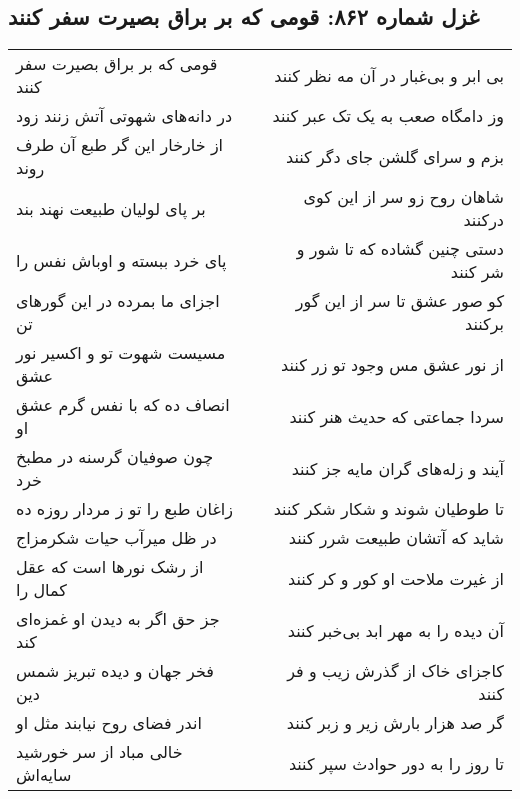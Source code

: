 \begin{center}
\section*{غزل شماره ۸۶۲: قومی که بر براق بصیرت سفر کنند}
\label{sec:0862}
\begin{longtable}{l p{0.5cm} r}
قومی که بر براق بصیرت سفر کنند
&&
بی ابر و بی‌غبار در آن مه نظر کنند
\\
در دانه‌های شهوتی آتش زنند زود
&&
وز دامگاه صعب به یک تک عبر کنند
\\
از خارخار این گر طبع آن طرف روند
&&
بزم و سرای گلشن جای دگر کنند
\\
بر پای لولیان طبیعت نهند بند
&&
شاهان روح زو سر از این کوی درکنند
\\
پای خرد ببسته و اوباش نفس را
&&
دستی چنین گشاده که تا شور و شر کنند
\\
اجزای ما بمرده در این گورهای تن
&&
کو صور عشق تا سر از این گور برکنند
\\
مسیست شهوت تو و اکسیر نور عشق
&&
از نور عشق مس وجود تو زر کنند
\\
انصاف ده که با نفس گرم عشق او
&&
سردا جماعتی که حدیث هنر کنند
\\
چون صوفیان گرسنه در مطبخ خرد
&&
آیند و زله‌های گران مایه جز کنند
\\
زاغان طبع را تو ز مردار روزه ده
&&
تا طوطیان شوند و شکار شکر کنند
\\
در ظل میرآب حیات شکرمزاج
&&
شاید که آتشان طبیعت شرر کنند
\\
از رشک نورها است که عقل کمال را
&&
از غیرت ملاحت او کور و کر کنند
\\
جز حق اگر به دیدن او غمزه‌ای کند
&&
آن دیده را به مهر ابد بی‌خبر کنند
\\
فخر جهان و دیده تبریز شمس دین
&&
کاجزای خاک از گذرش زیب و فر کنند
\\
اندر فضای روح نیابند مثل او
&&
گر صد هزار بارش زیر و زبر کنند
\\
خالی مباد از سر خورشید سایه‌اش
&&
تا روز را به دور حوادث سپر کنند
\\
\end{longtable}
\end{center}
